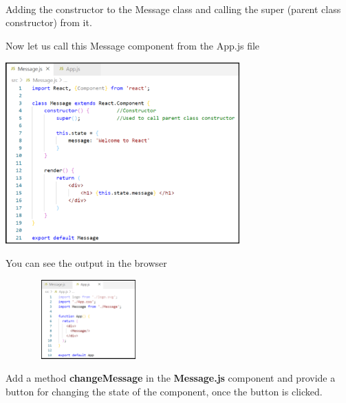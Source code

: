 \documentclass{article}
\begin{document}
\noindent 

\noindent \\
Adding the constructor to the Message class and calling the super (parent class constructor) from it.

\noindent 
\newpage
\noindent 
Now let us call this Message component from the App.js file

\noindent 


\begin{center}
	\noindent \includegraphics*[width=3.54in, height=2.75in]{IMG-09-28}
\end{center}

\noindent 

\noindent 
You can see the output in the browser

\begin{center}
	\noindent \includegraphics*[width=2.51in, height=1.20in]{IMG-09-29}
\end{center}

\noindent 

\noindent 
Add a method \textbf{changeMessage} in the \textbf{Message.js} component and provide a button for changing the state of the component, once the button is clicked.
\end{document}
